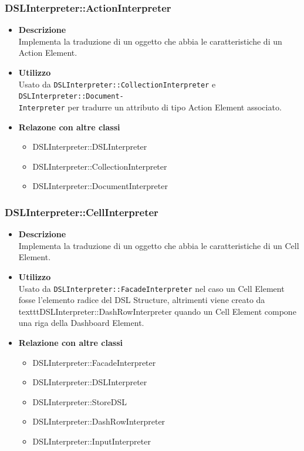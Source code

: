 \subsubsection{DSLInterpreter::ActionInterpreter}
\begin{itemize}
\item \textbf{Descrizione} \hfill \\
Implementa la traduzione di un oggetto che abbia le caratteristiche di un Action Element.
\item \textbf{Utilizzo} \hfill \\
Usato da \texttt{DSLInterpreter::CollectionInterpreter} e \texttt{DSLInterpreter::Document-}\\\texttt{Interpreter} per tradurre un attributo di tipo Action Element associato.
\item \textbf{Relazone con altre classi}
\begin{itemize}
\item DSLInterpreter::DSLInterpreter
\item DSLInterpreter::CollectionInterpreter
\item DSLInterpreter::DocumentInterpreter
\end{itemize}
\end{itemize}

\subsubsection{DSLInterpreter::CellInterpreter}
\begin{itemize}
\item \textbf{Descrizione} \hfill \\
Implementa la traduzione di un oggetto che abbia le caratteristiche di un Cell Element.
\item \textbf{Utilizzo} \hfill \\
Usato da \texttt{DSLInterpreter::FacadeInterpreter} nel caso un Cell Element fosse l'elemento radice del DSL Structure, altrimenti viene creato da \\texttt{DSLInterpreter::DashRowInterpreter} quando un Cell Element compone una riga della Dashboard Element.
\item \textbf{Relazione con altre classi}
\begin{itemize}
\item DSLInterpreter::FacadeInterpreter
\item DSLInterpreter::DSLInterpreter
\item DSLInterpreter::StoreDSL
\item DSLInterpreter::DashRowInterpreter
\item DSLInterpreter::InputInterpreter
\end{itemize}
\end{itemize}

